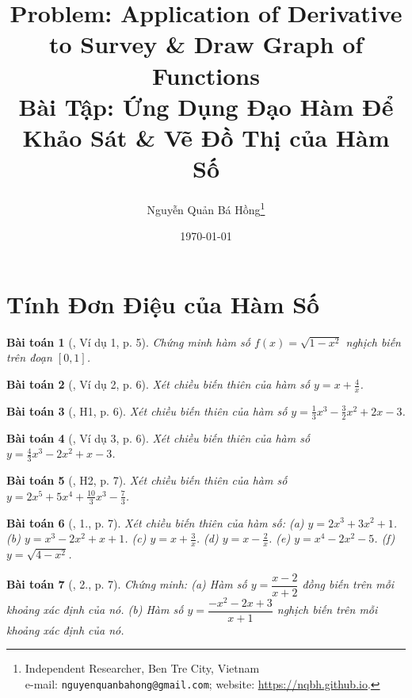 \documentclass{article}
\title{Problem: Application of Derivative to Survey \& Draw Graph of Functions\\Bài Tập: Ứng Dụng Đạo Hàm Để Khảo Sát \& Vẽ Đồ Thị của Hàm Số}
\author{Nguyễn Quản Bá Hồng\footnote{Independent Researcher, Ben Tre City, Vietnam\\e-mail: \texttt{nguyenquanbahong@gmail.com}; website: \url{https://nqbh.github.io}.}}
\date{\today}
\newtheorem{baitoan}{Bài toán}
\begin{document}
\maketitle
\tableofcontents


\section{Tính Đơn Điệu của Hàm Số}


\begin{baitoan}[\cite{SGK_Toan_12_giai_tich_nang_cao}, Ví dụ 1, p. 5]
	Chứng minh hàm số $f(x) = \sqrt{1 - x^2}$ nghịch biến trên đoạn $[0,1]$.
\end{baitoan}

\begin{baitoan}[\cite{SGK_Toan_12_giai_tich_nang_cao}, Ví dụ 2, p. 6]
	Xét chiều biến thiên của hàm số $y = x + \frac{4}{x}$.
\end{baitoan}

\begin{baitoan}[\cite{SGK_Toan_12_giai_tich_nang_cao}, H1, p. 6]
	Xét chiều biến thiên của hàm số $y = \frac{1}{3}x^3 - \frac{3}{2}x^2 + 2x - 3$.
\end{baitoan}

\begin{baitoan}[\cite{SGK_Toan_12_giai_tich_nang_cao}, Ví dụ 3, p. 6]
	Xét chiều biến thiên của hàm số $y = \frac{4}{3}x^3 - 2x^2 + x - 3$.
\end{baitoan}

\begin{baitoan}[\cite{SGK_Toan_12_giai_tich_nang_cao}, H2, p. 7]
	Xét chiều biến thiên của hàm số $y = 2x^5 + 5x^4 + \frac{10}{3}x^3 - \frac{7}{3}$.
\end{baitoan}

\begin{baitoan}[\cite{SGK_Toan_12_giai_tich_nang_cao}, 1., p. 7]
	Xét chiều biến thiên của hàm số: (a) $y = 2x^3 + 3x^2 + 1$. (b) $y = x^3 - 2x^2 + x + 1$. (c) $y = x + \frac{3}{x}$. (d) $y = x - \frac{2}{x}$. (e) $y = x^4 - 2x^2 - 5$. (f) $y = \sqrt{4 - x^2}$.
\end{baitoan}

\begin{baitoan}[\cite{SGK_Toan_12_giai_tich_nang_cao}, 2., p. 7]
	Chứng minh: (a) Hàm số $y = \dfrac{x - 2}{x + 2}$ đồng biến trên mỗi khoảng xác định của nó. (b) Hàm số $y = \dfrac{-x^2 - 2x + 3}{x + 1}$ nghịch biến trên mỗi khoảng xác định của nó.
\end{baitoan}
\end{document}
